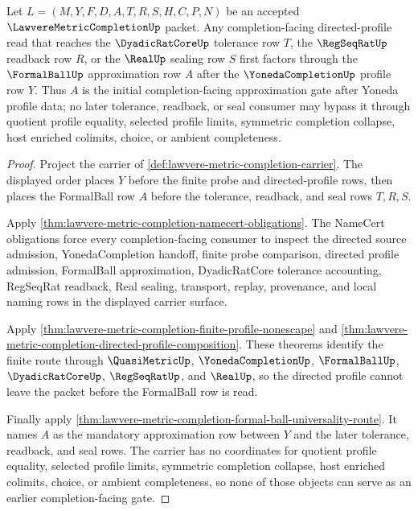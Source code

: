 \begin{theorem}
\label{thm:lawvere-metric-completion-formal-ball-profile-initiality}
Let $L=(M,Y,F,D,A,T,R,S,H,C,P,N)$ be an accepted $\LawvereMetricCompletionUp$ packet. Any completion-facing directed-profile read that reaches the $\DyadicRatCoreUp$ tolerance row $T$, the $\RegSeqRatUp$ readback row $R$, or the $\RealUp$ sealing row $S$ first factors through the $\FormalBallUp$ approximation row $A$ after the $\YonedaCompletionUp$ profile row $Y$. Thus $A$ is the initial completion-facing approximation gate after Yoneda profile data; no later tolerance, readback, or seal consumer may bypass it through quotient profile equality, selected profile limits, symmetric completion collapse, host enriched colimits, choice, or ambient completeness.
\end{theorem}
\begin{proof}
Project the carrier of \autoref{def:lawvere-metric-completion-carrier}. The displayed order places $Y$ before the finite probe and directed-profile rows, then places the FormalBall row $A$ before the tolerance, readback, and seal rows $T,R,S$.

Apply \autoref{thm:lawvere-metric-completion-namecert-obligations}. The NameCert obligations force every completion-facing consumer to inspect the directed source admission, YonedaCompletion handoff, finite probe comparison, directed profile admission, FormalBall approximation, DyadicRatCore tolerance accounting, RegSeqRat readback, Real sealing, transport, replay, provenance, and local naming rows in the displayed carrier surface.

Apply \autoref{thm:lawvere-metric-completion-finite-profile-nonescape} and \autoref{thm:lawvere-metric-completion-directed-profile-composition}. These theorems identify the finite route through $\QuasiMetricUp$, $\YonedaCompletionUp$, $\FormalBallUp$, $\DyadicRatCoreUp$, $\RegSeqRatUp$, and $\RealUp$, so the directed profile cannot leave the packet before the FormalBall row is read.

Finally apply \autoref{thm:lawvere-metric-completion-formal-ball-universality-route}. It names $A$ as the mandatory approximation row between $Y$ and the later tolerance, readback, and seal rows. The carrier has no coordinates for quotient profile equality, selected profile limits, symmetric completion collapse, host enriched colimits, choice, or ambient completeness, so none of those objects can serve as an earlier completion-facing gate.
\end{proof}

